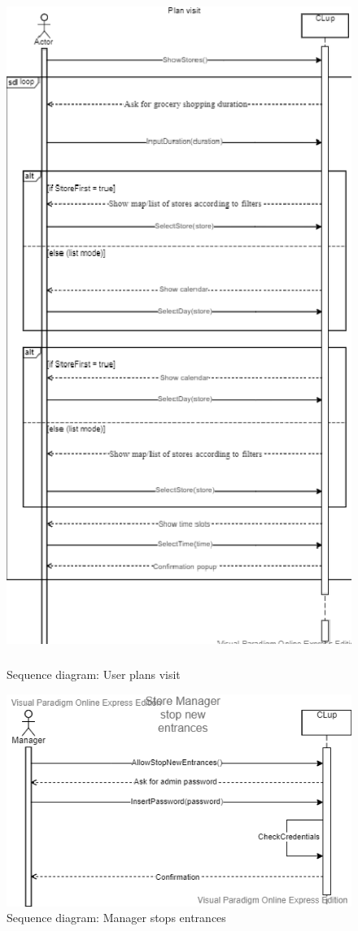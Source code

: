 \begin{figure}[H]
	\includegraphics[width=\linewidth, height=22cm]{../Diagrams/PlanVisit.png}
	\caption{Sequence diagram: User plans visit}
	\label{fig:PlanVisit}
\end{figure} 

\begin{figure}[H]
	\includegraphics[width=\linewidth]{../Diagrams/StopEntrances.png}
	\caption{Sequence diagram: Manager stops entrances}
	\label{fig:StopEntr}
\end{figure} 

